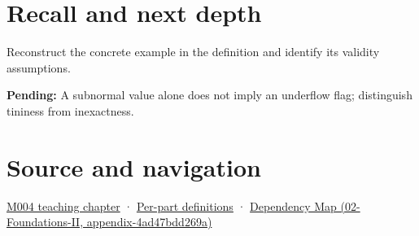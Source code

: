 \section{Recall and next depth}\label{appendix-00a6e044c437-recall-and-next-depth}

Reconstruct the concrete example in the definition and identify its validity assumptions.

\textbf{Pending:} A subnormal value alone does not imply an underflow flag; distinguish tininess from inexactness.

\section{Source and navigation}\label{appendix-00a6e044c437-source-and-navigation}

\href{Continuous\%20Notes/Computing\%20Foundations\%20-\%20From\%20Bits\%20to\%20C++\%20and\%20Systems\%20APIs\#A\%20stretching\%20ruler\%20for\%20real-valued\%20quantities}{M004 teaching chapter} · \hyperref[appendix-fd090d982a15-m004---parts-61-76]{Per-part definitions} · \href{../02-Foundations-II/main.pdf\#nameddest=appendix-4ad47bdd269a}{Dependency Map (02-Foundations-II, appendix-4ad47bdd269a)}
